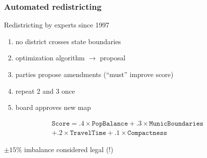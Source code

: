 \documentclass[xcolor=dvipsnames]{beamer}  %
\begin{document}
\begin{frame}                      %

    \frametitle{Automated redistricting}

Redistricting by experts since 1997

\begin{enumerate}
\item no district crosses state boundaries
\item optimization algorithm $\rightarrow$ proposal
\item parties propose amendments (``must'' improve score)
\item repeat 2 and 3 once
\item board approves new map
\end{enumerate}

\begin{multline*}
\texttt{Score} = .4 \times \texttt{PopBalance} + .3 \times \texttt{MunicBoundaries} \\
+ .2 \times \texttt{TravelTime} + .1 \times \texttt{Compactness}
\end{multline*}


$\pm15\%$ imbalance considered legal (!)


\end{frame}
\end{document}
